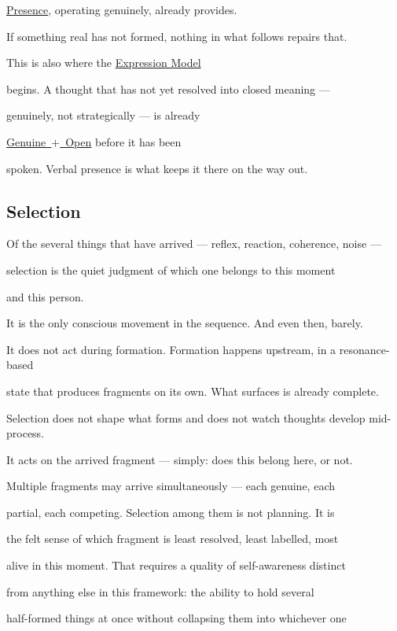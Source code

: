 \documentclass[12pt, a4paper]{article}
\begin{document}
\hyperref[sec:presence]{Presence}, operating genuinely, already provides.

If something real has not formed, nothing in what follows repairs that.

This is also where the \hyperref[sec:expression_origin]{Expression Model}

begins. A thought that has not yet resolved into closed meaning ---

genuinely, not strategically --- is already

\hyperref[sec:expression_origin]{Genuine~$+$~Open} before it has been

spoken. Verbal presence is what keeps it there on the way out.


\subsection{Selection}

Of the several things that have arrived --- reflex, reaction, coherence, noise ---

selection is the quiet judgment of which one belongs to this moment

and this person.

It is the only conscious movement in the sequence. And even then, barely.

It does not act during formation. Formation happens upstream, in a resonance-based

state that produces fragments on its own. What surfaces is already complete.

Selection does not shape what forms and does not watch thoughts develop mid-process.

It acts on the arrived fragment --- simply: does this belong here, or not.

Multiple fragments may arrive simultaneously --- each genuine, each

partial, each competing. Selection among them is not planning. It is

the felt sense of which fragment is least resolved, least labelled, most

alive in this moment. That requires a quality of self-awareness distinct

from anything else in this framework: the ability to hold several

half-formed things at once without collapsing them into whichever one
\end{document}
